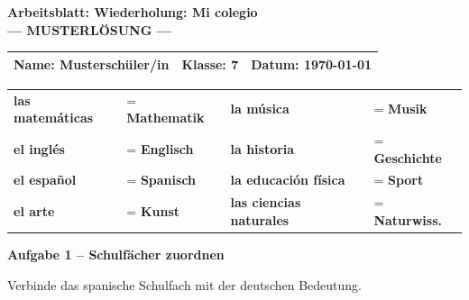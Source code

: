 \documentclass[11pt, a4paper]{article}
\newcommand{\fachfarbe}{spanisch}
\newcommand{\thema}{Wiederholung: Mi colegio}
\newcommand{\klasse}{7}
\newcommand{\datum}{\today}
\newcommand{\punktebox}[1]{\hfill\fbox{\small \_/#1}}
\newcommand{\lsg}[1]{\textcolor{loesung}{\textbf{#1}}}
\newenvironment{aufgabe}[1]{%
    \needspace{5\baselineskip}%
    \nopagebreak[4]%
    \vspace{10pt}
    \noindent\textbf{\textcolor{\fachfarbe}{Aufgabe #1}}
    \nopagebreak[4]%
    \vspace{5pt}
    \nopagebreak[4]%
    \begin{list}{}{\leftmargin=0pt}
    \item[]
}{%
    \end{list}
}
\newcommand{\es}[1]{\textcolor{\fachfarbe}{\textbf{#1}}}
\begin{document}

\begin{center}
    {\Large\bfseries\textcolor{\fachfarbe}{Arbeitsblatt: \thema}}\\[0.3em]
    {\large\textcolor{loesung}{\textbf{--- MUSTERLÖSUNG ---}}}
\end{center}

\vspace{5pt}

\noindent
\begin{tabularx}{\textwidth}{|X|X|X|}
\hline
\textbf{Name:} \lsg{Musterschüler/in} &
\textbf{Klasse:} \klasse &
\textbf{Datum:} \datum \\
\hline
\end{tabularx}

\vspace{15pt}


\begin{merkkasten}

\begin{tabular}{ll|ll}
\es{las matemáticas} & = \lsg{Mathematik} & \es{la música} & = \lsg{Musik} \\[0.5em]
\es{el inglés} & = \lsg{Englisch} & \es{la historia} & = \lsg{Geschichte} \\[0.5em]
\es{el español} & = \lsg{Spanisch} & \es{la educación física} & = \lsg{Sport} \\[0.5em]
\es{el arte} & = \lsg{Kunst} & \es{las ciencias naturales} & = \lsg{Naturwiss.} \\
\end{tabular}

\end{merkkasten}

\vspace{10pt}


\begin{aufgabe}{1 -- Schulfächer zuordnen}
Verbinde das spanische Schulfach mit der deutschen Bedeutung. \punktebox{4}
\end{aufgabe}
\end{document}
